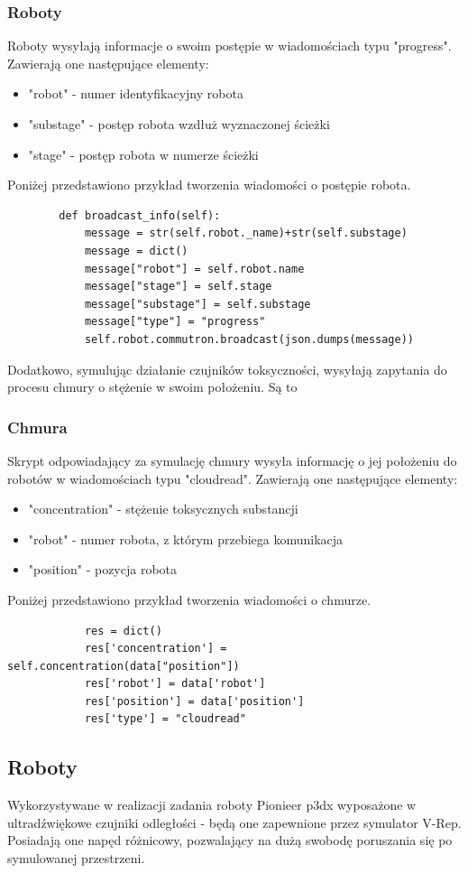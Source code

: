 \documentclass[a4paper, 12pt]{article}
\begin{document}
	\subsubsection{Roboty}
	Roboty wysyłają informacje o swoim postępie w wiadomościach typu "progress". Zawierają one następujące elementy:
	\begin{itemize}
	\item "robot" - numer identyfikacyjny robota
	\item "substage" - postęp robota wzdłuż wyznaczonej ścieżki
	\item "stage" - postęp robota w numerze ścieżki
	\end{itemize}
	Poniżej przedstawiono przykład tworzenia wiadomości o postępie robota.
	\begin{verbatim}
	    def broadcast_info(self):
	        message = str(self.robot._name)+str(self.substage)
	        message = dict()
	        message["robot"] = self.robot.name
	        message["stage"] = self.stage
	        message["substage"] = self.substage
	        message["type"] = "progress"
	        self.robot.commutron.broadcast(json.dumps(message))
	\end{verbatim}
	Dodatkowo, symulując działanie czujników toksyczności, wysyłają zapytania do procesu chmury o stężenie w swoim położeniu. Są to
	\subsubsection{Chmura}
	Skrypt odpowiadający za symulację chmury wysyła informację o jej położeniu do robotów w wiadomościach typu "cloudread".
	Zawierają one następujące elementy:
	\begin{itemize}
	\item "concentration" - stężenie toksycznych substancji
	\item "robot" - numer robota, z którym przebiega komunikacja
	\item "position" - pozycja robota
	\end{itemize}
	Poniżej przedstawiono przykład tworzenia wiadomości o chmurze.
	\begin{verbatim}
	        res = dict()
	        res['concentration'] = self.concentration(data["position"])
	        res['robot'] = data['robot']
	        res['position'] = data['position']
	        res['type'] = "cloudread"
	\end{verbatim}
	
	
	\subsection{Roboty}
	Wykorzystywane w realizacji zadania roboty Pionieer p3dx wyposażone w ultradźwiękowe czujniki odległości - będą one zapewnione przez symulator V-Rep. Posiadają one napęd różnicowy, pozwalający na dużą swobodę poruszania się po symulowanej przestrzeni.
	
\end{document}
